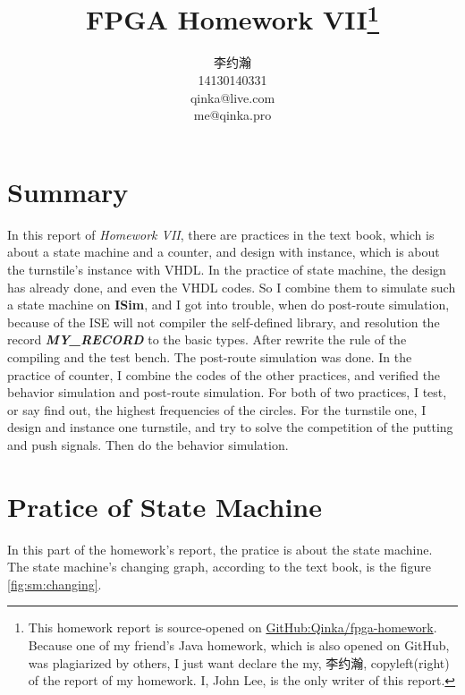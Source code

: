 \documentclass{article}
\title{FPGA Homework VII\thanks{%
        This homework report is source-opened on
        \href{https://github.com/Qinka/fgpa-homework}{GitHub:Qinka/fpga-homework}.
        Because one of my friend's Java homework, which is also opened on GitHub, was plagiarized by others, I just want declare the my, 李约瀚, copyleft(right) of the report of my homework.
        I, John Lee, is the only writer of this report.
    }}
\author{李约瀚 \\ 14130140331 \\ qinka@live.com \\ me@qinka.pro}
\begin{document}
    \maketitle
    \newpage
    \tableofcontents
    \newpage
    
    \section{Summary}
    \label{sec:summary}
    
    In this report of \textit{Homework VII}, there are practices in the text book, which is about a state machine and a counter,
    and design with instance, which is about the turnstile's instance with VHDL. In the practice of state machine, 
    the design has already done, and even the VHDL codes. So I combine them to simulate such a state machine on \textbf{ISim},
    and I got into trouble, when do post-route simulation, because of the ISE will not compiler the self-defined library, and
    resolution the record \textbf{\textit{MY\_RECORD}} to the basic types. After rewrite the rule of the compiling and 
    the test bench. The post-route simulation was done. In the practice of counter, I combine the codes of the other practices,
    and verified the behavior simulation and post-route simulation. For both of two practices, I test, or say find out,
    the highest frequencies of the circles. For the turnstile one, I design and instance one turnstile, and try to solve the
    competition of the putting and push signals. Then do the behavior simulation.
    
    
    \section{Pratice of State Machine}
    \label{sec:p:sm}
    
    In this part of the homework's report, the pratice is about the state machine.
    The state machine's changing graph, according to the text book, is the figure \ref{fig:sm:changing}.
    
\end{document}
